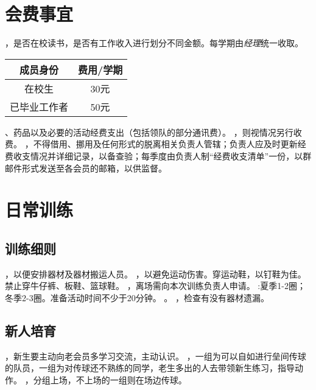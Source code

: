 \documentclass[11pt,a4paper,titlepage]{article}
\begin{document}
	\section{会费事宜}
		\begin{enumerate}
		，是否在校读书，是否有工作收入进行划分不同金额。每学期由\emph{经理}统一收取。\\
			\begin{table}[htbp]
			\centering
			\begin{tabular} {|c|c|}
				\hline
				成员身份 & 费用/学期 \\
				\hline
				在校生 & 30元 \\
				\hline
				已毕业工作者 & 50元 \\
				\hline
			\end{tabular}
			\end{table}
		、药品以及必要的活动经费支出（包括领队的部分通讯费）。
		，则视情况另行收费。
		，不得借用、挪用及任何形式的脱离相关负责人管辖；负责人应及时更新经费收支情况并详细记录，以备查验；每季度由负责人制“经费收支清单”一份，以群邮件形式发送至各会员的邮箱，以供监督。
		\end{enumerate}
	\section{日常训练}
		\subsection{训练细则}
			\begin{itemize} 
				，以便安排器材及器材搬运人员。
				，以避免运动伤害。穿运动鞋，以钉鞋为佳。禁止穿牛仔裤、板鞋、篮球鞋。
				，离场需向本次训练负责人申请。
				:夏季1-2圈；冬季2-3圈。准备活动时间不少于20分钟。
				。
				，检查有没有器材遗漏。
			\end{itemize} 
		\subsection{新人培育}
			\begin{itemize} 
				，新生要主动向老会员多学习交流，主动认识。
				，一组为可以自如进行垒间传球的队员，一组为对传球还不熟练的同学，老生多出的人去带领新生练习，指导动作。
				，分组上场，不上场的一组则在场边传球。
			\end{itemize} 
\end{document}
